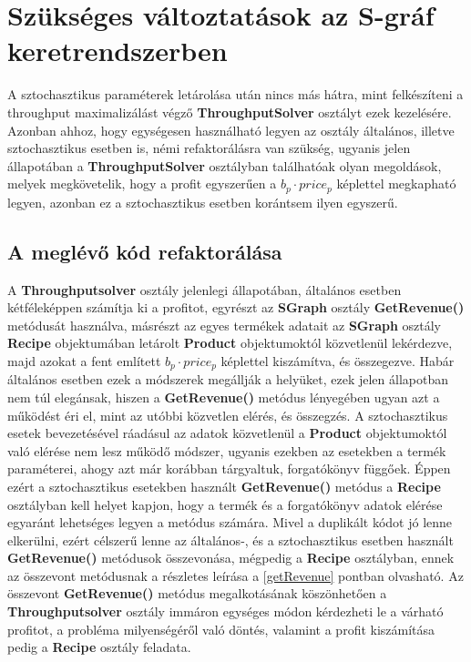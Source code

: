 \section{Szükséges változtatások az S-gráf keretrendszerben} \label{refactor}
A sztochasztikus paraméterek letárolása után nincs más hátra, mint felkészíteni a throughput maximalizálást végző \textbf{ThroughputSolver} osztályt ezek kezelésére. Azonban ahhoz, hogy egységesen használható legyen az osztály általános, illetve sztochasztikus esetben is, némi refaktorálásra van szükség, ugyanis jelen állapotában a \textbf{ThroughputSolver} osztályban találhatóak olyan megoldások, melyek megkövetelik, hogy a profit egyszerűen a $b_p\cdot price_p$ képlettel megkapható legyen, azonban ez a sztochasztikus esetben korántsem ilyen egyszerű.
\subsection{A meglévő kód refaktorálása}
A \textbf{Throughputsolver} osztály jelenlegi állapotában, általános esetben kétféleképpen számítja ki a profitot, egyrészt az \textbf{SGraph} osztály \textbf{GetRevenue()} metódusát használva, másrészt az egyes termékek adatait az \textbf{SGraph} osztály \textbf{Recipe} objektumában letárolt \textbf{Product} objektumoktól közvetlenül lekérdezve, majd azokat a fent említett $b_p\cdot price_p$ képlettel kiszámítva, és összegezve. Habár általános esetben ezek a módszerek megállják a helyüket, ezek jelen állapotban nem túl elegánsak, hiszen a \textbf{GetRevenue()} metódus lényegében ugyan azt a működést éri el, mint az utóbbi közvetlen elérés, és összegzés. A sztochasztikus esetek bevezetésével ráadásul az adatok közvetlenül a \textbf{Product} objektumoktól való elérése nem lesz működő módszer, ugyanis ezekben az esetekben a termék paraméterei, ahogy azt már korábban tárgyaltuk, forgatókönyv függőek. Éppen ezért a sztochasztikus esetekben használt \textbf{GetRevenue()} metódus a \textbf{Recipe} osztályban kell helyet kapjon, hogy a termék és a forgatókönyv adatok elérése egyaránt lehetséges legyen a metódus számára. Mivel a duplikált kódot jó lenne elkerülni, ezért célszerű lenne az általános-, és a sztochasztikus esetben használt \textbf{GetRevenue()} metódusok összevonása, mégpedig a \textbf{Recipe} osztályban, ennek az összevont metódusnak a részletes leírása a \ref{getRevenue} pontban olvasható. Az összevont \textbf{GetRevenue()} metódus megalkotásának köszönhetően a \textbf{Throughputsolver} osztály immáron egységes módon kérdezheti le a várható profitot, a probléma milyenségéről való döntés, valamint a profit kiszámítása pedig a \textbf{Recipe} osztály feladata.
